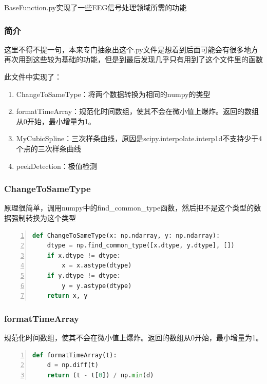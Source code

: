 \documentclass[cs4size,a4paper]{ctexart}
\numberwithin{equation}{section}
\numberwithin{table}{section}
\numberwithin{figure}{section}
\begin{document}
\colorbox{LetMeFlyGray}{BaseFunction.py}实现了一些EEG信号处理领域所需的功能

\subsubsection{简介}

这里不得不提一句，本来专门抽象出这个\colorbox{LetMeFlyGray}{.py}文件是想着到后面可能会有很多地方再次用到这些较为基础的功能，但是到最后发现几乎只有\colorbox{LetMeFlyGray}{用到了这个文件里的函数}

此文件中实现了：

\begin{enumerate}
    \item ChangeToSameType：将两个数据转换为相同的numpy的类型
    \item formatTimeArray：规范化时间数组，使其不会在微小值上爆炸。返回的数组从0开始，最小增量为1。
    \item MyCubicSpline：三次样条曲线，原因是scipy.interpolate.interp1d不支持少于4个点的三次样条曲线
    \item peekDetection：极值检测
\end{enumerate}

\subsubsection{ChangeToSameType}

原理很简单，调用numpy中的find\_common\_type函数，然后把不是这个类型的数据强制转换为这个类型

\begin{lstlisting}[language={python},
numbers=left,
numberstyle=\tiny\monaco,
basicstyle=\footnotesize\monaco]
def ChangeToSameType(x: np.ndarray, y: np.ndarray):
    dtype = np.find_common_type([x.dtype, y.dtype], [])
    if x.dtype != dtype:
        x = x.astype(dtype)
    if y.dtype != dtype:
        y = y.astype(dtype)
    return x, y
\end{lstlisting}

\subsubsection{formatTimeArray}

规范化时间数组，使其不会在微小值上爆炸。返回的数组从0开始，最小增量为1。

\begin{lstlisting}[language={python},
numbers=left,
numberstyle=\tiny\monaco,
basicstyle=\footnotesize\monaco]
def formatTimeArray(t):
    d = np.diff(t)
    return (t - t[0]) / np.min(d)
\end{lstlisting}
\end{document}
